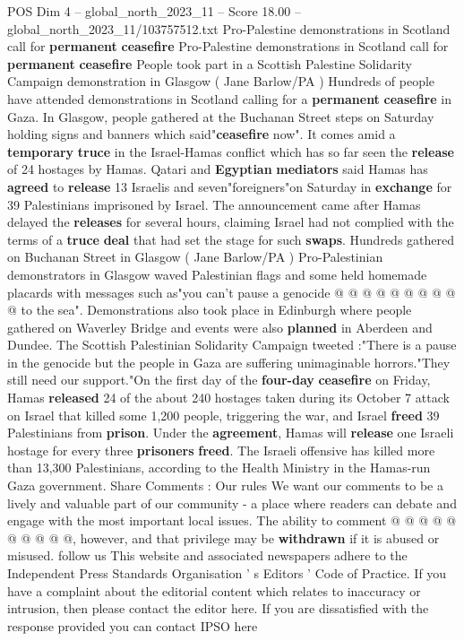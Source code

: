 \begin{textsample}{POS Dim 4 – global\_north\_2023\_11 – Score 18.00 – global\_north\_2023\_11/103757512.txt}  \label{ex:f4_pos_203}
Pro-Palestine demonstrations in Scotland call for \textbf{permanent} \textbf{ceasefire} Pro-Palestine demonstrations in Scotland call for \textbf{permanent} \textbf{ceasefire} People took part in a Scottish Palestine Solidarity Campaign demonstration in Glasgow ( Jane Barlow/PA ) Hundreds of people have attended demonstrations in Scotland calling for a \textbf{permanent} \textbf{ceasefire} in Gaza.
In Glasgow, people gathered at the Buchanan Street steps on Saturday holding signs and banners which said"\textbf{ceasefire} now".
It comes amid a \textbf{temporary} \textbf{truce} in the Israel-Hamas conflict which has so far seen the \textbf{release} of 24 hostages by Hamas.
Qatari and \textbf{Egyptian} \textbf{mediators} said Hamas has \textbf{agreed} to \textbf{release} 13 Israelis and seven"foreigners"on Saturday in \textbf{exchange} for 39 Palestinians imprisoned by Israel.
The announcement came after Hamas delayed the \textbf{releases} for several hours, claiming Israel had not complied with the terms of a \textbf{truce} \textbf{deal} that had set the stage for such \textbf{swaps}.
Hundreds gathered on Buchanan Street in Glasgow ( Jane Barlow/PA ) Pro-Palestinian demonstrators in Glasgow waved Palestinian flags and some held homemade placards with messages such as"you can't pause a genocide @ @ @ @ @ @ @ @ @ @ to the sea".
Demonstrations also took place in Edinburgh where people gathered on Waverley Bridge and events were also \textbf{planned} in Aberdeen and Dundee.
The Scottish Palestinian Solidarity Campaign tweeted :"There is a pause in the genocide but the people in Gaza are suffering unimaginable horrors."They still need our support."On the first day of the \textbf{four-day} \textbf{ceasefire} on Friday, Hamas \textbf{released} 24 of the about 240 hostages taken during its October 7 attack on Israel that killed some 1,200 people, triggering the war, and Israel \textbf{freed} 39 Palestinians from \textbf{prison}.
Under the \textbf{agreement}, Hamas will \textbf{release} one Israeli hostage for every three \textbf{prisoners} \textbf{freed}.
The Israeli offensive has killed more than 13,300 Palestinians, according to the Health Ministry in the Hamas-run Gaza government.
Share Comments : Our rules We want our comments to be a lively and valuable part of our community - a place where readers can debate and engage with the most important local issues.
The ability to comment @ @ @ @ @ @ @ @ @ @, however, and that privilege may be \textbf{withdrawn} if it is abused or misused. follow us This website and associated newspapers adhere to the Independent Press Standards Organisation ' s Editors ' Code of Practice.
If you have a complaint about the editorial content which relates to inaccuracy or intrusion, then please contact the editor here.
If you are dissatisfied with the response provided you can contact IPSO here

\end{textsample}
